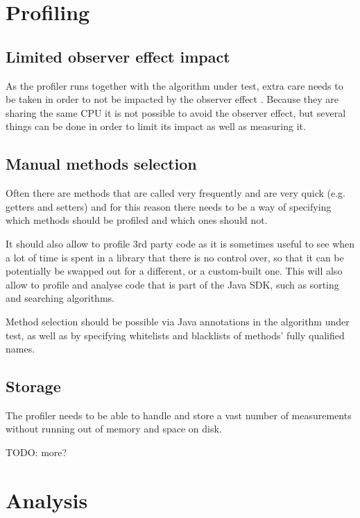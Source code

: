 \section{Profiling}
\label{sec:requirementanalysis:profiling}

\subsection{Limited observer effect impact}
As the profiler runs together with the algorithm under test, extra care needs to be taken in order to not be impacted by the observer effect \cite{MSH08}. Because they are sharing the same CPU it is not possible to avoid the observer effect, but several things can be done in order to limit its impact as well as measuring it.

\subsection{Manual methods selection}
Often there are methods that are called very frequently and are very quick (e.g. getters and setters) and for this reason there needs to be a way of specifying which methods should be profiled and which ones should not.

\noindent It should also allow to profile 3rd party code as it is sometimes useful to see when a lot of time is spent in a library that there is no control over, so that it can be potentially be swapped out for a different, or a custom-built one. This will also allow to profile and analyse code that is part of the Java SDK, such as sorting and searching algorithms.

\noindent Method selection should be possible via Java annotations in the algorithm under test, as well as by specifying whitelists and blacklists of methods' fully qualified names.

\subsection{Storage}
The profiler needs to be able to handle and store a vast number of measurements without running out of memory and space on disk.


\noindent TODO: more?

\section{Analysis}
\label{sec:requirementanalysis:analysis}

